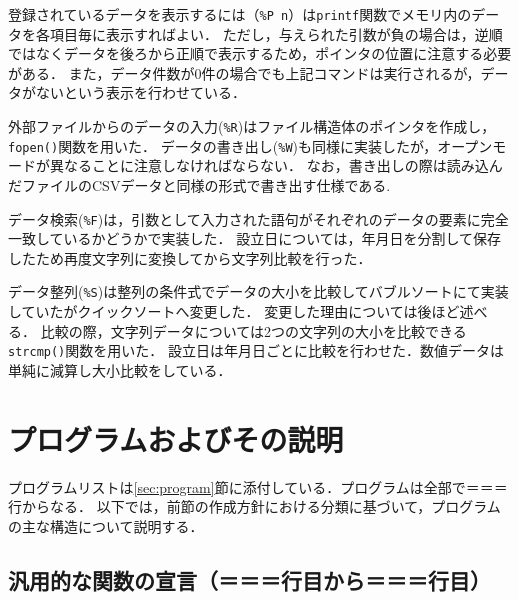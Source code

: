 \documentclass[a4j,11pt]{jarticle}
\begin{document}
登録されているデータを表示するには（\verb|%P n|）は\verb|printf|関数でメモリ内のデータを各項目毎に表示すればよい．
ただし，与えられた引数が負の場合は，逆順ではなくデータを後ろから正順で表示するため，ポインタの位置に注意する必要がある．
また，データ件数が0件の場合でも上記コマンドは実行されるが，データがないという表示を行わせている．

外部ファイルからのデータの入力(\verb|%R|)はファイル構造体のポインタを作成し，\verb|fopen()|関数を用いた．
データの書き出し(\verb|%W|)も同様に実装したが，オープンモードが異なることに注意しなければならない．
なお，書き出しの際は読み込んだファイルのCSVデータと同様の形式で書き出す仕様である.

データ検索(\verb|%F|)は，引数として入力された語句がそれぞれのデータの要素に完全一致しているかどうかで実装した．
設立日については，年月日を分割して保存したため再度文字列に変換してから文字列比較を行った．

データ整列(\verb|%S|)は整列の条件式でデータの大小を比較してバブルソートにて実装していたがクイックソートへ変更した．
変更した理由については後ほど述べる．
比較の際，文字列データについては2つの文字列の大小を比較できる\verb|strcmp()|関数を用いた．
設立日は年月日ごとに比較を行わせた．数値データは単純に減算し大小比較をしている．


\section{プログラムおよびその説明}\label{sec:explain}



プログラムリストは\ref{sec:program}節に添付している．プログラムは全部で＝＝＝行からなる．
以下では，前節の作成方針における分類に基づいて，プログラムの主な構造について説明する．

\subsection{汎用的な関数の宣言（＝＝＝行目から＝＝＝行目）}
\end{document}

